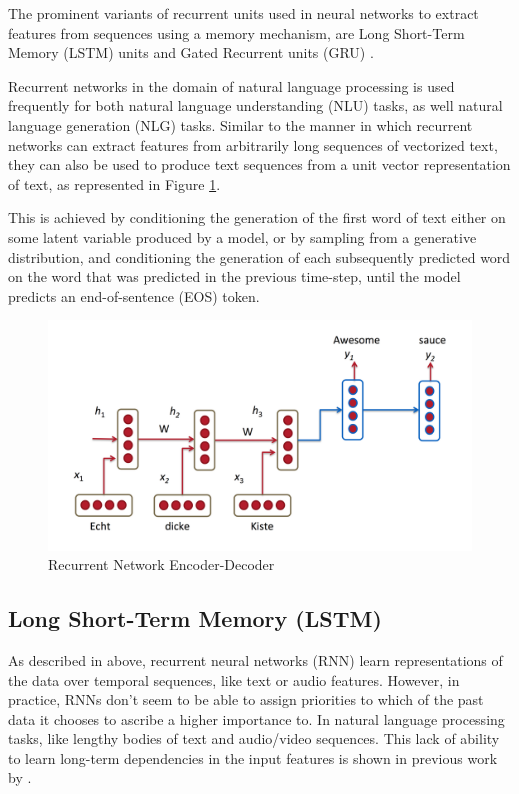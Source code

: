 The prominent variants of recurrent units used in neural networks to extract features from sequences using a memory mechanism, are Long Short-Term Memory (LSTM) units \citep{gers2001lstm} and Gated Recurrent units (GRU) \citep{chung2014empirical}.

Recurrent networks in the domain of natural language processing is used frequently for both natural language understanding (NLU) tasks, as well natural language generation (NLG) tasks. Similar to the manner in which recurrent networks can extract features from arbitrarily long sequences of vectorized text, they can also be used to produce text sequences from a unit vector representation of text, as represented in Figure \ref{fig:rnn-nmt}.

This is achieved by conditioning the generation of the first word of text either on some latent variable produced by a model, or by sampling from a generative distribution, and conditioning the generation of each subsequently predicted word on the word that was predicted in the previous time-step, until the model predicts an end-of-sentence (EOS) token.

\begin{figure}[ht]
	\centering
	\includegraphics[width=\textwidth]{images/rnn-nmt}
	\caption{\label{fig:rnn-nmt} Recurrent Network Encoder-Decoder}
\end{figure}


\subsection{Long Short-Term Memory (LSTM)}

As described in above, recurrent neural networks (RNN) learn representations of the data over temporal sequences, like text or audio features. However, in practice, RNNs don't seem to be able to assign priorities to which of the past data it chooses to ascribe a higher importance to. In natural language processing tasks, like lengthy bodies of text and audio/video sequences. This lack of ability to learn long-term dependencies in the input features is shown in previous work by \cite{bengio1994learning}. 

